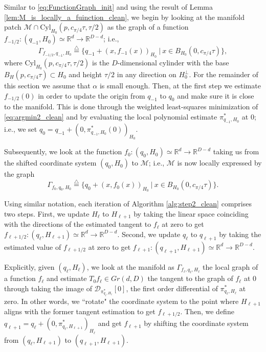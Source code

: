\documentclass[12pt]{article}
\theoremstyle{remark}
\newcommand{\RR}{\mathbb{R}}
\newcommand{\MM}{\mathcal{M}}
\newcommand{\DD}{\mathcal{D}}
\newcommand{\defeq}{\stackrel{\bigtriangleup}{=}}
\begin{document}
Similar to \eqref{eq:FunctionGraph_init} and using the result of Lemma \ref{lem:M_is_locally_a_fuinction_clean}, we begin by looking at the manifold patch $\MM \cap \textrm{Cyl}_{H_0}(p,c_{\pi/4}\tau,\tau/2)$ as the graph of a function $f_{-1/2}:(q_{-1},H_0) \simeq\RR^d\to\RR^{D-d}$; i.e., 
\begin{equation}
 \Gamma_{f_{-1/2}, q_{-1},H_0} \defeq \{q_{-1} + (x, f_{-1}(x))_{H_0} ~|~ x\in B_{H_0}(0, c_{\pi/4}\tau)\}  
,\end{equation}
where $\textrm{Cyl}_{H_0}(p,c_{\pi/4}\tau, \tau/2)$ is the $D$-dimensional cylinder with the base $B_H(p, c_{\pi/4}\tau)\subset H_0$ and height $\tau/2$ in any direction on $H_0^\perp$. 
For the remainder of this section we assume that $ \alpha $ is small enough.
Then, at the first step we estimate $f_{-1/2}(0)$ in order to update the origin from $q_{-1}$ to $q_0$ and make sure it is close to the manifold. 
This is done through the weighted least-squares minimization of \eqref{eq:argmin2_clean} and by evaluating the local polynomial estimate $\pi^*_{q_{-1}, H_0}$ at $ 0 $; i.e., we set $q_0 = q_{-1} + (0,\pi^*_{q_{-1}, H_0}(0))_{H_0}$.

Subsequently, we look at the function $f_0:(q_0,H_0) \simeq \RR^d\to\RR^{D-d}$ taking us from the shifted coordinate system $(q_0, H_0)$ to $\MM$; i.e., $\MM$ is now locally expressed by the graph 
\begin{equation}
 \Gamma_{f_0, q_0, H_0} \defeq \{q_{0} + (x, f_0(x))_{H_0} ~|~ x\in B_{H_0}(0,c_{\pi/4}\tau)\}
.\end{equation}

Using similar notation, each iteration of Algorithm \ref{alg:step2_clean} comprises two steps. First, we update $H_\ell$ to $H_{\ell + 1}$ by taking the linear space coinciding with the directions of the estimated tangent to $f_{\ell }$ at zero to get $f_{\ell+ 1/2}:(q_\ell, H_{\ell+1}) \simeq \RR^d \to \RR^{D-d}$. Second, we update $q_\ell$ to $q_{\ell+1} $ by taking the estimated value of $f_{\ell+1/2}$ at zero to get $f_{\ell+1}:(q_{\ell+1},H_{\ell+1}) \simeq \RR^d \to \RR^{D-d}$.

Explicitly, given $(q_{\ell}, H_{\ell})$, we look at the manifold as $\Gamma_{f_{\ell}, q_{\ell}, H_{\ell}}$ the local graph of a function $f_{\ell}$ and estimate $T_0 f_{\ell} \in Gr(d, D)$ the tangent to the graph of $f_{\ell}$ at $0$ through taking the image of $\DD_{\pi^*_{q_{\ell}, H_{\ell}}}[0]$, the first order differential of $\pi^*_{q_{\ell }, H_{\ell }}$ at zero.
In other words, we ``rotate" the coordinate system to the point where $H_{\ell+1}$ aligns with the former tangent estimation to get $f_{\ell+1/2}$. 
Then, we define 
 $ q_{\ell+1}  =  q_\ell + ( 0 , \pi^*_{q_\ell, H_{\ell+1}} )_{H_\ell} $ and get $f_{\ell +1}$ by shifting the coordinate system from $(q_\ell, H_{\ell+1})$ to $(q_{\ell+1}, H_{\ell+1})$.
\end{document}
